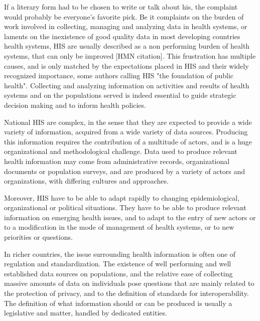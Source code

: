 If a literary form had to be chosen to write or talk about \gls*{his}, the complaint would probably be everyone's favorite pick. Be it complaints on the burden of work involved in collecting, managing and analyzing data in health systems, or laments on the inexistence of good quality data in most developing countries health systems, HIS are usually described as a non performing burden of health systems, that can only be improved [HMN citation]. This frustration has multiple causes, and is only matched by the expectations placed in HIS and their widely recognized importance, some authors calling HIS "the foundation of public health"\cite{foundph}. Collecting and analyzing information on activities and results of health systems and on the populations served is indeed essential to guide strategic decision making and to inform health policies.

National HIS are complex, in the sense that they are expected to provide a wide variety of information, acquired from a wide variety of data sources. Producing this information requires the contribution of a multitude of actors, and is a huge organizational and methodological challenge. Data used to produce relevant health information may come from administrative records, organizational documents or population surveys, and are produced by a variety of actors and organizations, with differing cultures and approaches.

Moreover, HIS have to be able to adapt rapidly to changing epidemiological, organizational or political situations. They have to be able to produce relevant information on emerging health issues, and to adapt to the entry of new actors or to a modification in the mode of management of health systems, or to new priorities or questions.


In richer countries, the issue surrounding health information is often one of regulation and standardization. The  existence of well performing and well established data sources on populations, and the relative ease of collecting massive amounts of data on individuals pose questions that are mainly related to the protection of privacy, and to the definition of standards for interoperability. The definition of what information should or can be produced is usually a legislative and matter, handled by dedicated entities.


